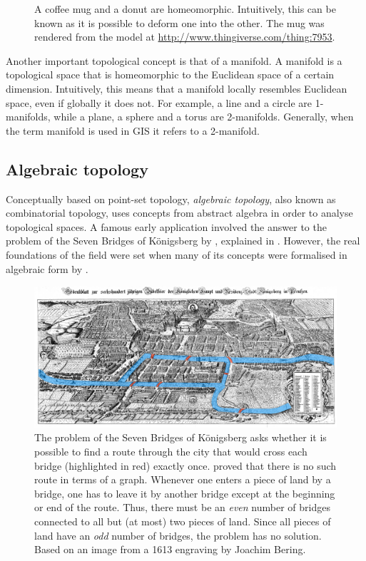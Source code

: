 \begin{figure}[b]
\caption[A coffee mug and a donut are homeomorphic]{A coffee mug and a donut are homeomorphic. Intuitively, this can be known as it is possible to deform one into the other. The mug was rendered from the model at \url{http://www.thingiverse.com/thing:7953}.}
\label{fig:homeomorphism}
\end{figure}

Another important topological concept is that of a manifold.
A manifold is a topological space that is homeomorphic to the Euclidean space of a certain dimension.
Intuitively, this means that a manifold locally resembles Euclidean space, even if globally it does not.
For example, a line and a circle are 1-manifolds, while a plane, a sphere and a torus are 2-manifolds.
Generally, when the term manifold is used in GIS it refers to a 2-manifold.

\subsection{Algebraic topology}
\label{ss:algebraic-topology}

Conceptually based on point-set topology, \emph{algebraic topology}, also known as combinatorial topology, uses concepts from abstract algebra in order to analyse topological spaces.
A famous early application involved the answer to the problem of the Seven Bridges of K\"onigsberg by \citet{Euler41}, explained in .
However, the real foundations of the field were set when many of its concepts were formalised in algebraic form by \citet{Poincare95}.

\begin{figure}[tbp]
\centering
\includegraphics[width=\linewidth]{figs/konigsberg}
\caption[The Seven Bridges of K\"onigsberg]{The problem of the Seven Bridges of K\"onigsberg asks whether it is possible to find a route through the city that would cross each bridge (highlighted in red) exactly once. \citet{Euler41} proved that there is no such route in terms of a graph. Whenever one enters a piece of land by a bridge, one has to leave it by another bridge except at the beginning or end of the route. Thus, there must be an \emph{even} number of bridges connected to all but (at most) two pieces of land. Since all pieces of land have an \emph{odd} number of bridges, the problem has no solution. Based on an image from a 1613 engraving by Joachim Bering.}
\label{fig:konigsberg}
\end{figure}


